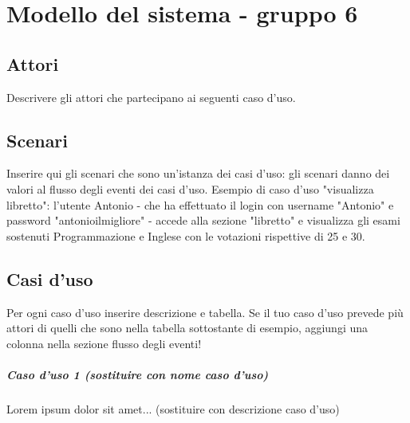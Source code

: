 
\chapter{Modello del sistema - gruppo 6}
\label{ref:modSistemaGruppo6}


\section{Attori}
Descrivere gli attori che partecipano ai seguenti caso d'uso.

\section{Scenari}
Inserire qui gli scenari che sono un'istanza dei casi d'uso: gli scenari danno dei valori al flusso degli eventi dei casi d'uso. Esempio di caso d'uso "visualizza libretto": l'utente Antonio - che ha effettuato il login con username "Antonio" e password "antonioilmigliore" - accede alla sezione "libretto" e visualizza gli esami sostenuti Programmazione e Inglese con le votazioni rispettive di 25 e 30.

\section{Casi d'uso}
Per ogni caso d'uso inserire descrizione e tabella. Se il tuo caso d'uso prevede più attori di quelli che sono nella tabella sottostante di esempio, aggiungi una colonna nella sezione flusso degli eventi!

\paragraph{Caso d'uso 1 (sostituire con nome caso d'uso) \\} 
Lorem ipsum dolor sit amet... (sostituire con descrizione caso d'uso)

